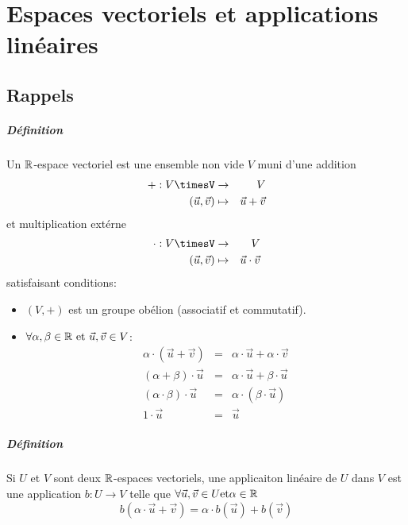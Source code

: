 \chapter{Espaces vectoriels et applications linéaires}

%
%
\section{Rappels}
%
%
\paragraph{Définition} Un $\mathbb{R}$-espace vectoriel est une ensemble non vide $V$ muni d'une addition
\begin{eqnarray*}
  +: V\timesV &\rightarrow& V \\
  (\vec{u}, \vec{v}) &\mapsto& \vec{u}+\vec{v}
\end{eqnarray*}
et multiplication extérne
\begin{eqnarray*}
  \cdot: V\timesV &\rightarrow& V \\
  (\vec{u}, \vec{v}) &\mapsto& \vec{u}\cdot\vec{v}
\end{eqnarray*}
satisfaisant conditions:
\begin{itemize}
  \item $(V, +)$ est un groupe obélion (associatif et commutatif).
  \item $\forall \alpha, \beta \in \mathbb{R} \text{ et } \vec{u}, \vec{v} \in V$:
    \begin{eqnarray*}
      \alpha \cdot (\vec{u} + \vec{v}) &=& \alpha \cdot \vec{u} + \alpha \cdot \vec{v} \\
      (\alpha + \beta) \cdot \vec{u} &=& \alpha \cdot \vec{u} + \beta \cdot \vec{u} \\
      (\alpha \cdot \beta)\cdot \vec{u} &=& \alpha \cdot (\beta \cdot \vec{u}) \\
      1 \cdot \vec{u} &=& \vec{u}
    \end{eqnarray*}
\end{itemize}

\paragraph{Définition} Si $U$ et $V$ sont deux $\mathbb{R}$-espaces vectoriels, une applicaiton linéaire de $U$ dans $V$ est une application $b: U \rightarrow V$ telle que $\forall \vec{u}, \vec{v} \in U \text{et} \alpha \in \mathbb{R}$
$$b(\alpha \cdot \vec{u} +\vec{v}) = \alpha \cdot b(\vec{u}) + b(\vec{v})$$

